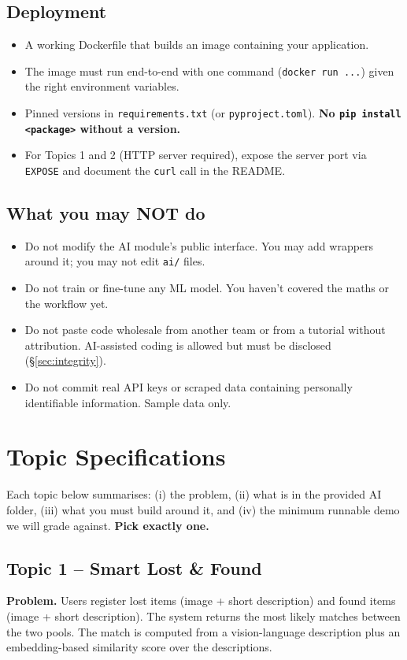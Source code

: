 \documentclass[11pt,a4paper]{article}
\newcommand{\warn}[1]{\textcolor{accent2}{\textbf{#1}}}
\begin{document}
\subsection{Deployment}
\begin{itemize}[topsep=2pt,itemsep=1pt]
  \item A working Dockerfile that builds an image containing your application.
  \item The image must run end-to-end with one command (\texttt{docker run ...}) given the right environment variables.
  \item Pinned versions in \texttt{requirements.txt} (or \texttt{pyproject.toml}). \warn{No \texttt{pip install <package>} without a version.}
  \item For Topics 1 and 2 (HTTP server required), expose the server port via \texttt{EXPOSE} and document the \texttt{curl} call in the README.
\end{itemize}

\subsection{What you may NOT do}
\begin{itemize}[topsep=2pt,itemsep=1pt]
  \item Do not modify the AI module's public interface. You may add wrappers around it; you may not edit \texttt{ai/} files.
  \item Do not train or fine-tune any ML model. You haven't covered the maths or the workflow yet.
  \item Do not paste code wholesale from another team or from a tutorial without attribution. AI-assisted coding is allowed but must be disclosed (§\ref{sec:integrity}).
  \item Do not commit real API keys or scraped data containing personally identifiable information. Sample data only.
\end{itemize}

\section{Topic Specifications}\label{sec:topics}
Each topic below summarises: (i) the problem, (ii) what is in the provided AI folder, (iii) what you must build around it, and (iv) the minimum runnable demo we will grade against. \warn{Pick exactly one.}

\subsection{Topic 1 -- Smart Lost \& Found}
\textbf{Problem.} Users register lost items (image + short description) and found items (image + short description). The system returns the most likely matches between the two pools. The match is computed from a vision-language description plus an embedding-based similarity score over the descriptions.
\end{document}
